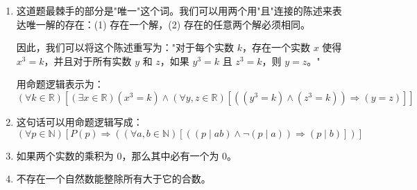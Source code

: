\documentclass[11pt,a4paper]{article}
\begin{document}
\begin{enumerate}[label=(\alph*)]
    \item \begin{solutionbox}
        这道题最棘手的部分是"唯一"这个词。我们可以用两个用"且"连接的陈述来表达唯一解的存在：(1) 存在一个解，(2) 存在的任意两个解必须相同。
        
        因此，我们可以将这个陈述重写为："对于每个实数 $k$，存在一个实数 $x$ 使得 $x^3 = k$，并且对于所有实数 $y$ 和 $z$，如果 $y^3 = k$ 且 $z^3 = k$，则 $y = z$。"
        
        用命题逻辑表示为：
        \[
        (\forall k \in \mathbb{R})\left[(\exists x \in \mathbb{R})(x^3 = k) \land (\forall y,z \in \mathbb{R})[((y^3 = k) \land (z^3 = k)) \Rightarrow (y = z)]\right]
        \]
    \end{solutionbox}
    
    \item \begin{solutionbox}
        这句话可以用命题逻辑写成：
        \[
        (\forall p \in \mathbb{N})[P(p) \Rightarrow ((\forall a,b \in \mathbb{N})[((p \mid ab) \land \neg(p \mid a)) \Rightarrow (p \mid b)])]
        \]
    \end{solutionbox}
    
    \item \begin{solutionbox}
        如果两个实数的乘积为 0，那么其中必有一个为 0。
    \end{solutionbox}
    
    \item \begin{solutionbox}
        不存在一个自然数能整除所有大于它的合数。
    \end{solutionbox}
\end{enumerate}
\end{document}
